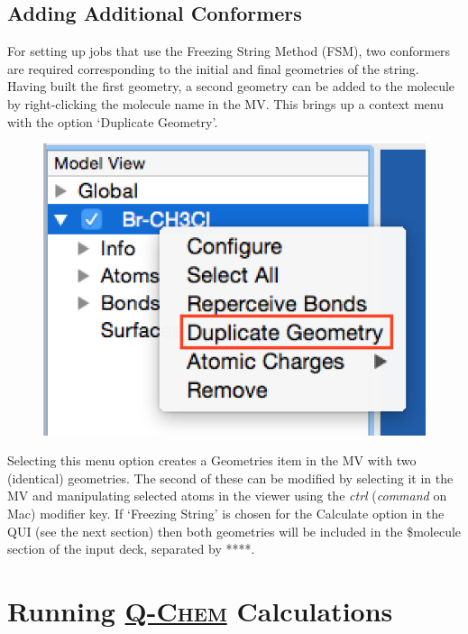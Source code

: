 \documentclass[a4paper,12pt]{article}
\newcommand{\qchem}{\href{https://q-chem.com}{{\scshape Q-Chem}}}
\begin{document}
\subsection{Adding Additional Conformers}

For setting up jobs that use the Freezing String Method (FSM), two conformers
are required corresponding to the initial and final geometries of the string.
Having built the first geometry, a second geometry can be added to the molecule
by right-clicking the molecule name in the MV.  This brings up a context menu
with the option `Duplicate Geometry'.  
\begin{figure}[h]
\begin{center}
\includegraphics[scale=0.4]{figures/MoleculeContext.png}
\end{center}
\end{figure}
Selecting this menu option creates a Geometries item in the MV with two
(identical) geometries.  The second of these can be modified by selecting it in
the MV and manipulating selected atoms in the viewer using the \emph{ctrl}
(\emph{command} on Mac) modifier key.  If `Freezing String' is chosen for the Calculate
option in the QUI (see the next section) then both geometries will be included
in the \$molecule section of the input deck, separated by ****.





\newpage
\section{Running \qchem{} Calculations}
\end{document}
